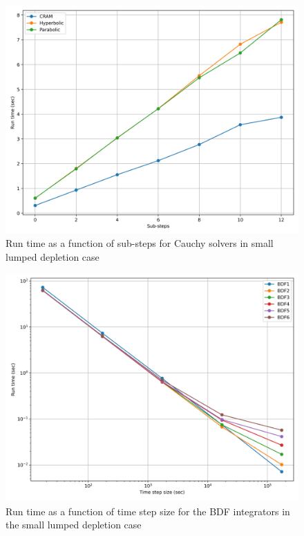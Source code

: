 \clearpage

\begin{figure}[p]
    \centering
    \includegraphics[width=5in]{images/chapter-5/caseStudies/smallLumpedDepletion/msrLumpedDepletionSmallCauchyRuntimes.png}
    \caption{Run time as a function of sub-steps for Cauchy solvers in small lumped depletion case}
    \label{fig:small_lumped_depletion_Cauchy_runtimes}
\end{figure}

\clearpage

\begin{figure}[p]
    \centering
    \includegraphics[width=5in]{images/chapter-5/caseStudies/smallLumpedDepletion/msrLumpedDepletionSmallIntegratorRuntimes.png}
    \caption{Run time as a function of time step size for the BDF integrators in the small lumped depletion case}
    \label{fig:small_lumped_depletion_integrator_runtimes}
\end{figure}


